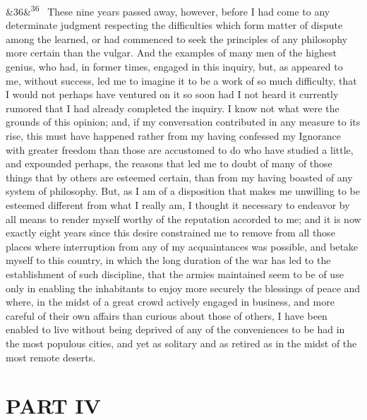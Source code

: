 \documentclass[12pt]{article}
\newcommand{\para}[1][]{\par\noindent\ifx&#1&\else\textsuperscript{\footnotesize #1}~\fi}
\begin{document}
\para[36] These nine years passed away, however, before I had come to any determinate judgment respecting the difficulties which form matter of dispute among the learned, or had commenced to seek the principles of any philosophy more certain than the vulgar. And the examples of many men of the highest genius, who had, in former times, engaged in this inquiry, but, as appeared to me, without success, led me to imagine it to be a work of so much difficulty, that I would not perhaps have ventured on it so soon had I not heard it currently rumored that I had already completed the inquiry. I know not what were the grounds of this opinion; and, if my conversation contributed in any measure to its rise, this must have happened rather from my having confessed my Ignorance with greater freedom than those are accustomed to do who have studied a little, and expounded perhaps, the reasons that led me to doubt of many of those things that by others are esteemed certain, than from my having boasted of any system of philosophy. But, as I am of a disposition that makes me unwilling to be esteemed different from what I really am, I thought it necessary to endeavor by all means to render myself worthy of the reputation accorded to me; and it is now exactly eight years since this desire constrained me to remove from all those places where interruption from any of my acquaintances was possible, and betake myself to this country, in which the long duration of the war has led to the establishment of such discipline, that the armies maintained seem to be of use only in enabling the inhabitants to enjoy more securely the blessings of peace and where, in the midst of a great crowd actively engaged in business, and more careful of their own affairs than curious about those of others, I have been enabled to live without being deprived of any of the conveniences to be had in the most populous cities, and yet as solitary and as retired as in the midst of the most remote deserts.

\section*{PART IV}
\end{document}
